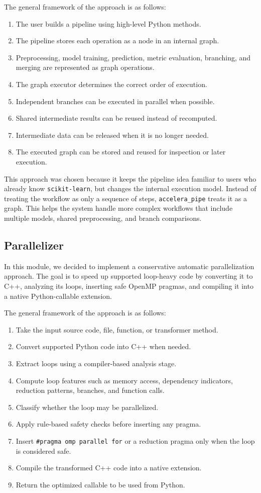 \documentclass[12pt,a4paper]{report}
\begin{document}
The general framework of the approach is as follows:
\begin{enumerate}
  \item The user builds a pipeline using high-level Python methods.
  \item The pipeline stores each operation as a node in an internal graph.
  \item Preprocessing, model training, prediction, metric evaluation, branching,
  and merging are represented as graph operations.
  \item The graph executor determines the correct order of execution.
  \item Independent branches can be executed in parallel when possible.
  \item Shared intermediate results can be reused instead of recomputed.
  \item Intermediate data can be released when it is no longer needed.
  \item The executed graph can be stored and reused for inspection or later execution.
\end{enumerate}

\noindent This approach was chosen because it keeps the pipeline idea familiar to
users who already know \texttt{scikit-learn}, but changes the internal execution
model. Instead of treating the workflow as only a sequence of steps,
\texttt{accelera\_pipe} treats it as a graph. This helps the system handle more
complex workflows that include multiple models, shared preprocessing, and branch
comparisons.

\subsection{Parallelizer}
In this module, we decided to implement a conservative automatic parallelization
approach. The goal is to speed up supported loop-heavy code by converting it to
C++, analyzing its loops, inserting safe OpenMP pragmas, and compiling it into a
native Python-callable extension.

The general framework of the approach is as follows:
\begin{enumerate}
  \item Take the input source code, file, function, or transformer method.
  \item Convert supported Python code into C++ when needed.
  \item Extract loops using a compiler-based analysis stage.
  \item Compute loop features such as memory access, dependency indicators,
  reduction patterns, branches, and function calls.
  \item Classify whether the loop may be parallelized.
  \item Apply rule-based safety checks before inserting any pragma.
  \item Insert \texttt{\#pragma omp parallel for} or a reduction pragma only
  when the loop is considered safe.
  \item Compile the transformed C++ code into a native extension.
  \item Return the optimized callable to be used from Python.
\end{enumerate}
\end{document}
